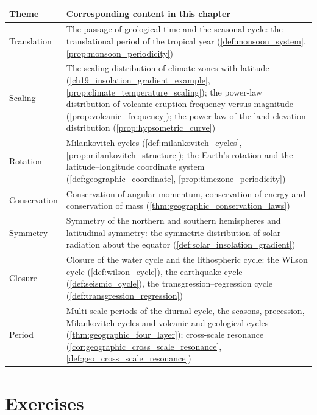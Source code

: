 \begin{center}
\renewcommand{\arraystretch}{1.3}
\begin{tabular}{>{\centering\arraybackslash}p{2.8cm}>{\centering\arraybackslash}p{9.9cm}}
\toprule
Theme & Corresponding content in this chapter \\
\midrule
Translation & The passage of geological time and the seasonal cycle: the translational period of the tropical year (\cref{def:monsoon_system}, \cref{prop:monsoon_periodicity}) \\
Scaling & The scaling distribution of climate zones with latitude (\cref{ch19_insolation_gradient_example}, \cref{prop:climate_temperature_scaling}); the power-law distribution of volcanic eruption frequency versus magnitude (\cref{prop:volcanic_frequency}); the power law of the land elevation distribution (\cref{prop:hypsometric_curve}) \\
Rotation & Milankovitch cycles (\cref{def:milankovitch_cycles}, \cref{prop:milankovitch_structure}); the Earth's rotation and the latitude--longitude coordinate system (\cref{def:geographic_coordinate}, \cref{prop:timezone_periodicity}) \\
Conservation & Conservation of angular momentum, conservation of energy and conservation of mass (\cref{thm:geographic_conservation_laws}) \\
Symmetry & Symmetry of the northern and southern hemispheres and latitudinal symmetry: the symmetric distribution of solar radiation about the equator (\cref{def:solar_insolation_gradient}) \\
Closure & Closure of the water cycle and the lithospheric cycle: the Wilson cycle (\cref{def:wilson_cycle}), the earthquake cycle (\cref{def:seismic_cycle}), the transgression--regression cycle (\cref{def:transgression_regression}) \\
Period & Multi-scale periods of the diurnal cycle, the seasons, precession, Milankovitch cycles and volcanic and geological cycles (\cref{thm:geographic_four_layer}); cross-scale resonance (\cref{cor:geographic_cross_scale_resonance}, \cref{def:geo_cross_scale_resonance}) \\
\bottomrule
\end{tabular}
\end{center}

\section*{Exercises}

